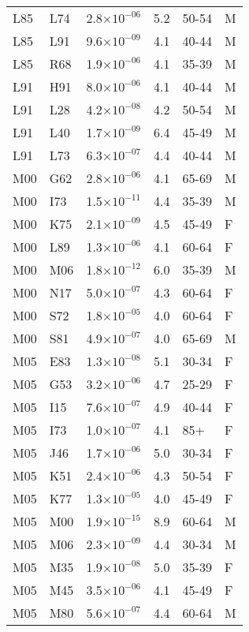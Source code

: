 \begin{longtable}{lllrll}
   L85 & L74 & 2.8$\times10^{-06}$ & 5.2 & 50-54 & M \\ 
   L85 & L91 & 9.6$\times10^{-09}$ & 4.1 & 40-44 & M \\ 
   L85 & R68 & 1.9$\times10^{-06}$ & 4.1 & 35-39 & M \\ 
   L91 & H91 & 8.0$\times10^{-06}$ & 4.1 & 40-44 & M \\ 
   L91 & L28 & 4.2$\times10^{-08}$ & 4.2 & 50-54 & M \\ 
   L91 & L40 & 1.7$\times10^{-09}$ & 6.4 & 45-49 & M \\ 
   L91 & L73 & 6.3$\times10^{-07}$ & 4.4 & 40-44 & M \\ 
   M00 & G62 & 2.8$\times10^{-06}$ & 4.1 & 65-69 & M \\ 
   M00 & I73 & 1.5$\times10^{-11}$ & 4.4 & 35-39 & M \\ 
   M00 & K75 & 2.1$\times10^{-09}$ & 4.5 & 45-49 & F \\ 
   M00 & L89 & 1.3$\times10^{-06}$ & 4.1 & 60-64 & F \\ 
   M00 & M06 & 1.8$\times10^{-12}$ & 6.0 & 35-39 & M \\ 
   M00 & N17 & 5.0$\times10^{-07}$ & 4.3 & 60-64 & F \\ 
   M00 & S72 & 1.8$\times10^{-05}$ & 4.0 & 60-64 & F \\ 
   M00 & S81 & 4.9$\times10^{-07}$ & 4.0 & 65-69 & M \\ 
   M05 & E83 & 1.3$\times10^{-08}$ & 5.1 & 30-34 & F \\ 
   M05 & G53 & 3.2$\times10^{-06}$ & 4.7 & 25-29 & F \\ 
   M05 & I15 & 7.6$\times10^{-07}$ & 4.9 & 40-44 & F \\ 
   M05 & I73 & 1.0$\times10^{-07}$ & 4.1 & 85+ & F \\ 
   M05 & J46 & 1.7$\times10^{-06}$ & 5.0 & 30-34 & F \\ 
   M05 & K51 & 2.4$\times10^{-06}$ & 4.3 & 50-54 & F \\ 
   M05 & K77 & 1.3$\times10^{-05}$ & 4.0 & 45-49 & F \\ 
   M05 & M00 & 1.9$\times10^{-15}$ & 8.9 & 60-64 & M \\ 
   M05 & M06 & 2.3$\times10^{-09}$ & 4.4 & 30-34 & M \\ 
   M05 & M35 & 1.9$\times10^{-08}$ & 5.0 & 35-39 & F \\ 
   M05 & M45 & 3.5$\times10^{-06}$ & 4.1 & 45-49 & F \\ 
   M05 & M80 & 5.6$\times10^{-07}$ & 4.4 & 60-64 & M \\ 

\end{longtable}
